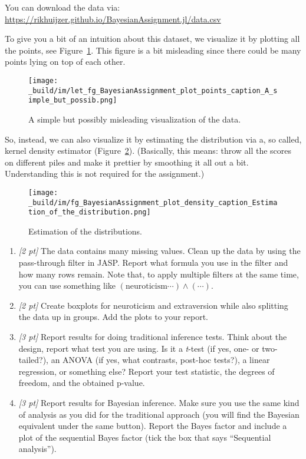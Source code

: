 \documentclass[
  notoc %
]{tufte-book}
\begin{document}
You can download the data via:\\
\url{https://rikhuijzer.github.io/BayesianAssignment.jl/data.csv}

To give you a bit of an intuition about this dataset, we visualize it by
plotting all the points, see Figure~\ref{fig:not_so_useful}. This figure
is a bit misleading since there could be many points lying on top of
each other.

\begin{figure}
\hypertarget{fig:not_so_useful}{%
\centering
\texttt{[image: \_build/im/let\_fg\_BayesianAssignment\_plot\_points\_caption\_A\_simple\_but\_possib.png]}
\caption{A simple but possibly misleading visualization of the
data.}\label{fig:not_so_useful}
}
\end{figure}

So, instead, we can also visualize it by estimating the distribution via
a, so called, kernel density estimator (Figure~\ref{fig:kde}).
(Basically, this means: throw all the scores on different piles and make
it prettier by smoothing it all out a bit. Understanding this is not
required for the assignment.)

\begin{figure}
\hypertarget{fig:kde}{%
\centering
\texttt{[image: \_build/im/fg\_BayesianAssignment\_plot\_density\_caption\_Estimation\_of\_the\_distribution.png]}
\caption{Estimation of the distributions.}\label{fig:kde}
}
\end{figure}

\newpage

\begin{enumerate}
\def\labelenumi{\arabic{enumi}.}
\item
  \emph{{[}2 pt{]}} The data contains many missing values. Clean up the
  data by using the pass-through filter in JASP. Report what formula you
  use in the filter and how many rows remain. Note that, to apply
  multiple filters at the same time, you can use something like
  \((\text{neuroticism} \cdots ) \land ( \cdots )\).
\item
  \emph{{[}2 pt{]}} Create boxplots for neuroticism and extraversion
  while also splitting the data up in groups. Add the plots to your
  report.
\item
  \emph{{[}3 pt{]}} Report results for doing traditional inference
  tests. Think about the design, report what test you are using. Is it a
  \emph{t}-test (if yes, one- or two-tailed?), an ANOVA (if yes, what
  contrasts, post-hoc tests?), a linear regression, or something else?
  Report your test statistic, the degrees of freedom, and the obtained
  p-value.
\item
  \emph{{[}3 pt{]}} Report results for Bayesian inference. Make sure you
  use the same kind of analysis as you did for the traditional approach
  (you will find the Bayesian equivalent under the same button). Report
  the Bayes factor and include a plot of the sequential Bayes factor
  (tick the box that says ``Sequential analysis'').
\end{enumerate}
\end{document}
